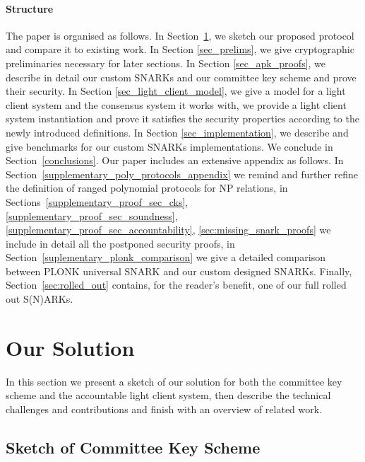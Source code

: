 \paragraph{Structure} The paper is organised as follows. In Section~\ref{sec:sketch}, we sketch our proposed protocol and compare it to existing work. 
In Section \ref{sec_prelims}, we give cryptographic preliminaries necessary for later sections. In Section \ref{sec_apk_proofs}, we describe in detail our 
custom SNARKs and our committee key scheme and prove their security. In Section \ref{sec_light_client_model}, we give a model for a light client system and 
the consensus system it works with, we provide a light client system instantiation and prove it satisfies the security properties according to the newly 
introduced definitions. In Section \ref{sec_implementation}, we describe and give benchmarks for our custom SNARKs implementations. We conclude in 
Section~\ref{conclusions}. Our paper includes an extensive appendix as follows. In Section~\ref{supplementary_poly_protocols_appendix} 
we remind and further refine the definition of ranged polynomial protocols for NP relations, in 
Sections~\ref{supplementary_proof_sec_cks}, \ref{supplementary_proof_sec_soundness}, \ref{supplementary_proof_sec_accountability}, \ref{sec:missing_snark_proofs} 
we include in detail all the postponed security proofs, in Section~\ref{suplementary_plonk_comparison} we give a detailed comparison between 
PLONK universal SNARK and our custom designed SNARKs. Finally, Section~\ref{sec:rolled_out} contains, for the reader's benefit, 
one of our full rolled out S(N)ARKs. 
\section{Our Solution} 
\label{sec:sketch}

In this section we present a sketch of our solution for both the committee key scheme and the accountable light client system, 
then describe the technical challenges and contributions and finish with an overview of related work.

\subsection{Sketch of Committee Key Scheme}

